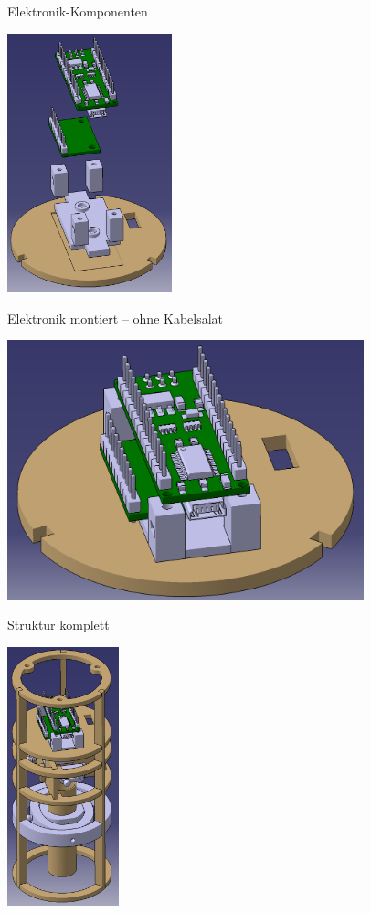 \documentclass{beamer}
\begin{document}
\begin{frame}{Elektronik-Komponenten}
\begin{center}\includegraphics[height=75mm]{elektronik_1.png}\end{center}
\end{frame}

\begin{frame}{Elektronik montiert -- ohne Kabelsalat}
\begin{center}\includegraphics[height=75mm]{elektronik_2.png}\end{center}
\end{frame}

\begin{frame}{Struktur komplett}
\begin{center}\includegraphics[height=75mm]{struktur_2.png}\end{center}
\end{frame}
\end{document}
